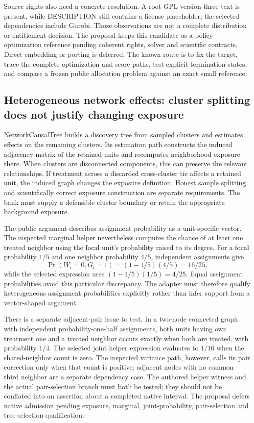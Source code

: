 Source rights also need a concrete resolution. A root GPL version-three text is present, while DESCRIPTION still contains a license placeholder; the selected dependencies include Gurobi. Those observations are not a complete distribution or entitlement decision. The proposal keeps this candidate as a policy-optimization reference pending coherent rights, solver and scientific contracts. Direct embedding or porting is deferred. The known route is to fix the target, trace the complete optimization and score paths, test explicit termination states, and compare a frozen public allocation problem against an exact small reference.~\citep{exec25_rnet_target,exec25_rnet_choice}

\subsection{Heterogeneous network effects: cluster splitting does not justify changing exposure}

NetworkCausalTree builds a discovery tree from sampled clusters and estimates effects on the remaining clusters. Its estimation path constructs the induced adjacency matrix of the retained units and recomputes neighborhood exposure there. When clusters are disconnected components, this can preserve the relevant relationships. If treatment across a discarded cross-cluster tie affects a retained unit, the induced graph changes the exposure definition. Honest sample splitting and scientifically correct exposure construction are separate requirements. The bank must supply a defensible cluster boundary or retain the appropriate background exposure.~\citep{exec25_rnet_tree}

The public argument describes assignment probability as a unit-specific vector. The inspected marginal helper nevertheless computes the chance of at least one treated neighbor using the focal unit's probability raised to its degree. For a focal probability $1/5$ and one neighbor probability $4/5$, independent assignments give
\[
 \Pr(W_i=0,G_i=1)=(1-1/5)(4/5)=16/25,
\]
while the selected expression uses $(1-1/5)(1/5)=4/25$. Equal assignment probabilities avoid this particular discrepancy. The adapter must therefore qualify heterogeneous assignment probabilities explicitly rather than infer support from a vector-shaped argument.~\citep{exec25_rnet_tree,exec25_rnet_choice}

There is a separate adjacent-pair issue to test. In a two-node connected graph with independent probability-one-half assignments, both units having own treatment one and a treated neighbor occurs exactly when both are treated, with probability $1/4$. The selected joint helper expression evaluates to $1/16$ when the shared-neighbor count is zero. The inspected variance path, however, calls its pair correction only when that count is positive: adjacent nodes with no common third neighbor are a separate dependency case. The authored helper witness and the actual pair-selection branch must both be tested; they should not be conflated into an assertion about a completed native interval. The proposal defers native admission pending exposure, marginal, joint-probability, pair-selection and tree-selection qualification.~\citep{exec25_rnet_tree,exec25_rnet_choice}

